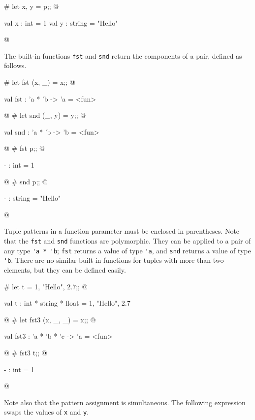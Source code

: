 \begin{ocaml}
# let x, y = p;;
@
\begin{topoutput}
val x : int = 1
val y : string = "Hello"
\end{topoutput}
@
\end{ocaml}
%
The built-in functions \hbox{\hbox{\lstinline/fst/}} and \hbox{\lstinline/snd/} return the components of
a pair, defined as follows.

\begin{ocaml}
# let fst (x, _) = x;;
@
\begin{topoutput}
val fst : 'a * 'b -> 'a = <fun>
\end{topoutput}
@
# let snd (_, y) = y;;
@
\begin{topoutput}
val snd : 'a * 'b -> 'b = <fun>
\end{topoutput}
@
# fst p;;
@
\begin{topoutput}
- : int = 1
\end{topoutput}
@
# snd p;;
@
\begin{topoutput}
- : string = "Hello"
\end{topoutput}
@
\end{ocaml}
%
Tuple patterns in a function parameter must be enclosed in parentheses.
Note that the \hbox{\hbox{\lstinline/fst/}} and \hbox{\lstinline/snd/} functions are polymorphic.
They can be applied to a pair of any type \hbox{\hbox{\lstinline/'a * 'b/}}; \hbox{\lstinline/fst/}
returns a value of type \hbox{\hbox{\lstinline/'a/}}, and \hbox{\lstinline/snd/} returns a value of
type \hbox{\hbox{\lstinline/'b/}}.
There are no similar built-in functions for tuples with more than two
elements, but they can be defined easily.

\begin{ocaml}
# let t = 1, "Hello", 2.7;;
@
\begin{topoutput}
val t : int * string * float = 1, "Hello", 2.7
\end{topoutput}
@
# let fst3 (x, _, _) = x;;
@
\begin{topoutput}
val fst3 : 'a * 'b * 'c -> 'a = <fun>
\end{topoutput}
@
# fst3 t;;
@
\begin{topoutput}
- : int = 1
\end{topoutput}
@
\end{ocaml}
%
Note also that the pattern assignment is simultaneous.  The
following expression swaps the values of \hbox{\hbox{\lstinline/x/}} and \hbox{\lstinline/y/}.

